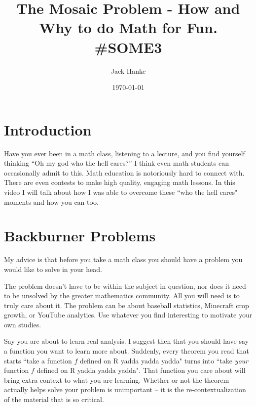 \documentclass[12pt]{article}
\title{The Mosaic Problem - How and Why to do Math for Fun. \#SOME3}
\author{Jack Hanke}
\date{\today}
\theoremstyle{plain}
\theoremstyle{definition}
\theoremstyle{remark}
\theoremstyle{definition}
\begin{document}
\maketitle





\section{Introduction}



Have you ever been in a math class, listening to a lecture, and you find yourself thinking
``Oh my god who the hell cares?''
I think even math students can occasionally admit to this. Math education is notoriously hard to connect with. There are even contests to make high quality, engaging math lessons. In this video I will talk about how I was able to overcome these ``who the hell cares" moments and how you can too. 

\section{Backburner Problems}

My advice is that before you take a math class you should have a problem you would like to solve in your head. 

The problem doesn't have to be within the subject in question, nor does it need to be unsolved by the greater mathematics community. All you will need is to truly care about it. The problem can be about baseball statistics, Minecraft crop growth, or YouTube analytics. Use whatever you find interesting to motivate your own studies.

Say you are about to learn real analysis. I suggest then that you should have say a function you want to learn more about. Suddenly, every theorem you read that starts ``take a function $f$ defined on R yadda yadda yadda" turns into ``take \textit{your} function $f$ defined on R yadda yadda yadda". That function you care about will bring extra context to what you are learning. Whether or not the theorem actually helps solve your problem is unimportant -- it is the re-contextualization of the material that is so critical.
\end{document}
